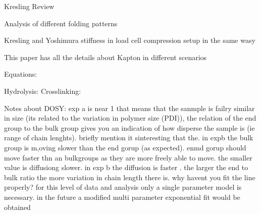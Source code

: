 \cite{zhang2025review}
Kresling Review

\cite{wickeler20234d}
Analysis of different folding patterns

\cite{sugiharto2026influence}
Kresling and Yoshimura stiffness in load cell compression setup in the same wasy

\cite{sroog1965aromatic}
This paper has all the details about Kapton in  different scenarios


Equations:

Hydrolysis: 
Crosslinking: 


Notes about DOSY:
exp a is near 1 that means that the sanmple is failry similar in size (its related to the variation in polymer size (PDI)), the relation of the end group to the bulk group gives you an indication of how disperse the sample is (ie range of chain lenghts). 
briefly mention it sinteresting that the. in expb the bulk group is m,oving slower than the end gorup (as expected). enmd gorup should move faster thn an bulkgroups as they are more freely able to move. the smaller value is diffusiong slower. in exp b the diffusion is faster . the larger the end to bulk ratio the more variation in chain length there is. why havent you fit the line properly? for this level of data and analysis only a single parameter model is necessary. in  the future a modified multi parameter exponential fit would be obtained
